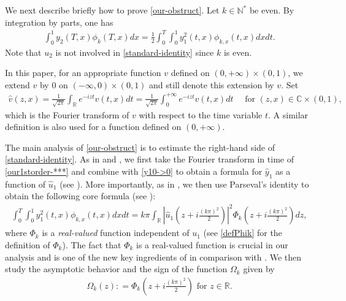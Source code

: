 \documentclass[11pt, reqno]{amsart}
\theoremstyle{plain}
\numberwithin{equation}{section}
\newcommand{\mN}{\mathbb{N}}
\newcommand{\hu}{\hat u}
\begin{document}
\medskip

We next describe briefly how to prove \eqref{our-obstruct}. Let $k \in \mN^*$ be even. By integration by parts, one has  
\begin{align} \label{standard-identity}
\int_0^1 y_2(T, x) \phi_k(T, x)  dx =  \frac{1}{2} \int_0^T \int_0^1 y_1^2(t, x) \phi_{k, x}(t, x)  dx  dt.  
\end{align}
Note that $u_2$ is not involved in \eqref{standard-identity} since $k$ is even. 

In this paper, for an appropriate function $v$ defined on $(0, +\infty) \times (0, 1)$, we extend $v$ by $0$ on $(-\infty, 0) \times (0, 1)$ and still denote this extension by $v$. Set 
\begin{align}   
    \hat{v}(z, x) = \frac{1}{\sqrt{2 \pi}} \int_{\mathbb{R}} e^{-i z t} v(t, x) dt = \frac{1}{\sqrt{2 \pi}} \int_0^{+\infty} e^{-i z t} v(t, x) dt \quad \text{ for } (z, x) \in \mathbb{C} \times (0, 1), 
\end{align}     
which is the Fourier transform of $v$ with respect to the time variable $t$.  A similar definition is also used for a function defined on $(0, +\infty)$.

 The main analysis of \eqref{our-obstruct} is to estimate the right-hand side of \eqref{standard-identity}. As in \cite{Coron-Koenig-Nguyen} and \cite{Nguyen}, we first take the Fourier transform in time of \eqref{our1storder-***} and combine with \eqref{y10->0} to obtain a formula for $\hat y_1$ as a function of $\hu_1$ (see ). More importantly, as in \cite{Nguyen}, we then use Parseval's identity to obtain the following core formula (see ):  
\begin{align} \label{key-1}
 \int_0^T \int_0^1 y_1^2(t, x) \phi_{k, x}(t, x) dx  dt = k \pi \int_{\mathbb{R}} \left| \hu_1\left(z + i \frac{(k \pi)^2}{2} \right) \right|^2 \Phi_k \left(z + i\frac{(k \pi)^2}{2} \right) dz,
\end{align}
where $\Phi_k$ is a \textit{real-valued} function independent of $u_1$ (see \eqref{defPhik} for the definition of $\Phi_k$). The fact that $\Phi_k$ is a real-valued function is crucial in our analysis and is one of the new key ingredients of \cite{Nguyen} in comparison with  \cite{Coron-Koenig-Nguyen}.  We then study the asymptotic behavior and the sign of the function $\Omega_k$ given by
\begin{align} \label{def-Omega}
	\Omega_k(z) : = \Phi_k \left(z + i \frac{(k \pi)^2}{2} \right) \mbox{ for } z \in \mathbb{R}.
\end{align}
\end{document}
